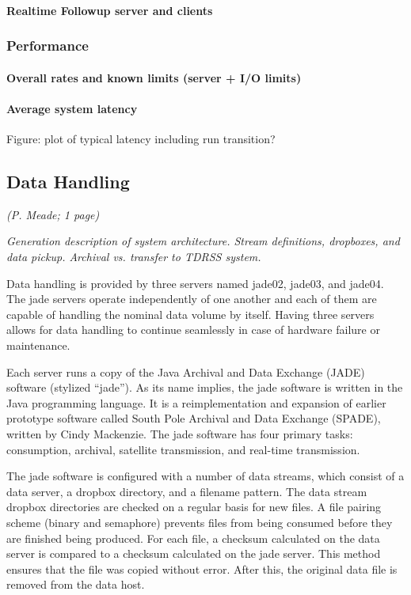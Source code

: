 \paragraph{Realtime Followup server and clients}

\subsubsection{Performance}
\paragraph{Overall rates and known limits (server + I/O limits)}
\paragraph{Average system latency}

Figure: plot of typical latency including run transition?

\subsection{Data Handling}
\textsl{(P. Meade; 1 page)}

\textsl{Generation description of system architecture.  Stream definitions, dropboxes,
and data pickup.  Archival vs. transfer to TDRSS system.  }

Data handling is provided by three servers named jade02, jade03, and jade04. The jade servers operate independently of one another and 
each of them are capable of handling the nominal data volume by itself. Having three servers allows for data handling to continue seamlessly 
in case of hardware failure or maintenance.

Each server runs a copy of the Java Archival and Data Exchange (JADE) software (stylized “jade”). As its name implies, the jade software 
is written in the Java programming language. It is a reimplementation and expansion of earlier prototype software called South Pole Archival
and Data Exchange (SPADE), written by Cindy Mackenzie. The jade software has four primary tasks: consumption, archival, satellite transmission, and real-time
transmission.

The jade software is configured with a number of data streams, which consist of a data server, a dropbox directory, and a filename pattern. 
The data stream dropbox directories are checked on a regular basis for new files. A file pairing scheme (binary and semaphore) prevents files 
from being consumed before they are finished being produced. For each file, a checksum calculated on the data server is compared to a checksum 
calculated on the jade server. This method ensures that the file was copied without error. After this, the original data file is removed from the data host.

